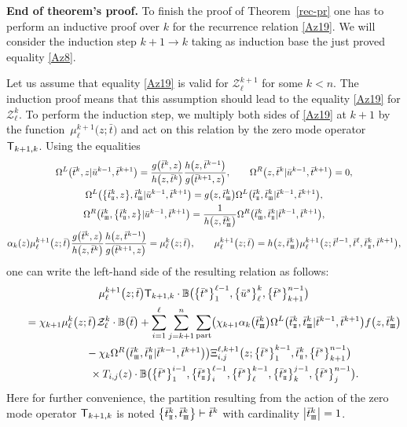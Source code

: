 \documentclass[pdftex]{sigma}
\newcommand{\st}{\scriptscriptstyle \rm I\hspace{-1pt}I}
\newcommand{\sth}{\scriptscriptstyle \rm I\hspace{-1pt}I\hspace{-1pt}I}
\newcommand{\bu}{\bar u}
\newcommand{\bt}{{\bar t}}
\theoremstyle{definition}
\def\BB{{\mathbb{B}}}
\def\r#1{\eqref{#1}}
\def\sT{{\sf T}}
\def\vk{\chi}
\def\Z{\mathcal{Z}}
\def\Oml{\Omega^L}
\def\Omr{\Omega^R}
\begin{document}
{\bf End of theorem's proof.}
To finish the proof of Theorem~\ref{rec-pr}
one has to perform an inductive proof over $k$ for the recurrence
relation \r{Az19}. We will consider the induction step $k+1\to k$ taking
as induction base the just proved equality \r{Az8}.

Let us assume that equality \r{Az19} is valid for $\Z_{\ell}^{k+1}$ for some $k<n$.
The induction proof means
 that this assumption should lead to the equality \r{Az19} for $\Z_{\ell}^{k}$.
To perform the induction step, we multiply both sides of \r{Az19} at $k+1$ by the function~$\mu^{k+1}_\ell\bigl(z;\bt\bigr)$ and act on this relation by the zero mode operator~$\sT_{k+1,k}$.
Using the equalities
\begin{gather*}
\Oml\bigl(\bt^k,z|\bu^{k-1},\bt^{k+1}\bigr)=\frac{g\bigl(\bt^k,z\bigr)}{h\bigl(z,\bt^k\bigr)}
\frac{h\bigl(z,\bt^{k-1}\bigr)}{g\bigl(\bt^{k+1},z\bigr)} ,\qquad
\Omr\bigl(z,\bt^k|\bu^{k-1},\bt^{k+1}\bigr)=0 ,\\
\Oml\bigl(\bigl\{\bt^k_{\st},z\bigr\},\bt^k_{\sth}|\bu^{k-1},\bt^{k+1}\bigr)=
g\bigl(z,\bt^k_{\sth}\bigr) \Oml\bigl(\bt^k_{\st},\bt^k_{\sth}|\bt^{k-1},\bt^{k+1}\bigr) ,\\
\Omr\bigl(\bt^k_{\sth},\bigl\{\bt^k_{\st},z\bigr\}|\bu^{k-1},\bt^{k+1}\bigr)=
\frac{1}{h\bigl(z,\bt^k_{\sth}\bigr)} \Omr\bigl(\bt^k_{\sth},\bt^k_{\st}|\bt^{k-1},\bt^{k+1}\bigr) ,\\
\alpha_k(z) \mu^{k+1}_\ell\bigl(z;\bt\bigr) \frac{g\bigl(\bt^k,z\bigr)}{h\bigl(z,\bt^k\bigr)}
\frac{h\bigl(z,\bt^{k-1}\bigr)}{g\bigl(\bt^{k+1},z\bigr)}=\mu^k_\ell\bigl(z;\bt\bigr) ,\qquad
\mu^{k+1}_\ell\bigl(z;\bt\bigr)=h\bigl(z,\bt^k_{\sth}\bigr) \mu^{k+1}_\ell\bigl(z;\bt^{l-1},\bt^\ell,\bt^k_{\st},\bt^{k+1}\bigr),
\end{gather*}
one can write the left-hand side of the resulting relation as follows:
\begin{gather}
\mu^{k+1}_\ell\bigl(z;\bt\bigr) \sT_{k+1,k}\cdot
\BB\bigl(\bigl\{\bt^s\bigr\}_{1}^{\ell-1},\bigl\{\bu^s\bigr\}_{\ell}^{k},\bigl\{\bt^s\bigr\}_{k+1}^{n-1}\bigr)\nonumber\\
\qquad
=\vk_{k+1} \mu^k_\ell\bigl(z;\bt\bigr) \Z^k_\ell\cdot\BB\bigl(\bt\bigr)+ \sum_{i=1}^\ell\sum_{j=k+1}^n\sum_{\rm part}
\bigl(\vk_{k+1} \alpha_k\bigl(\bt^k_{\sth}\bigr) \Oml\bigl(\bt^k_{\st},\bt^k_{\sth}|\bt^{k-1},\bt^{k+1}\bigr)
f\bigl(z,\bt^k_{\sth}\bigr)\nonumber\\
\phantom{\qquad
=}{}-\vk_k \Omr\bigl(\bt^k_{\sth},\bt^k_{\st}|\bt^{k-1},\bt^{k+1}\bigr)\bigr) \Xi^{\ell,k+1}_{i,j}\bigl(z;\bigl\{\bt^s\bigr\}_{1}^{k-1},
\bt^k_{\st},\bigl\{\bt^s\bigr\}_{k+1}^{n-1}\bigr)\nonumber\\
\phantom{\qquad
=-}{}\times
T_{i,j}(z)\cdot\BB\bigl(\bigl\{\bt^s\bigr\}_{1}^{i-1},\bigl\{\bt^s_{\st}\bigr\}_{i}^{\ell-1},\bigl\{\bt^s\bigr\}_{\ell}^{k-1},
\bigl\{\bt^s_{\st}\bigr\}_{k}^{j-1},\bigl\{\bt^s\bigr\}_{j}^{n-1}\bigr) .\label{Az20}
\end{gather}
Here for further convenience, the partition resulting from the action of the zero mode operator
$\sT_{k+1,k}$ is noted $\bigl\{\bt^k_{\st},\bt^k_{\sth}\bigr\}\vdash\bt^k$
with cardinality $\big|\bt^k_{\sth}\big|=1$.
\end{document}

